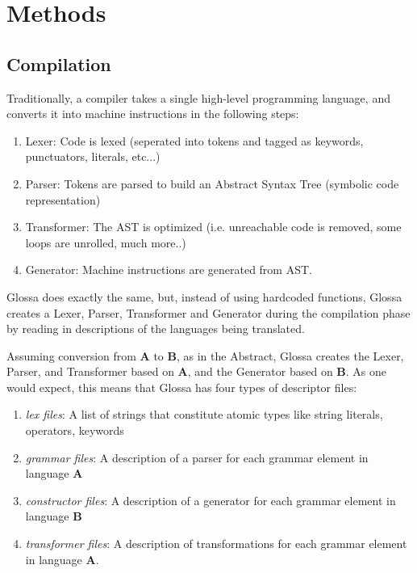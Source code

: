 \documentclass{article}
\begin{document}
\section{Methods}

\subsection{Compilation}
Traditionally, a compiler takes a single high-level programming language, and converts it into machine instructions in the following steps:
\begin{enumerate}
\item Lexer: Code is lexed (seperated into tokens and tagged as keywords, punctuators, literals, etc...)
\item Parser: Tokens are parsed to build an Abstract Syntax Tree (symbolic code representation)
\item Transformer: The AST is optimized (i.e. unreachable code is removed, some loops are unrolled, much more..)
\item Generator: Machine instructions are generated from AST.
\end{enumerate}

Glossa does exactly the same, but, instead of using hardcoded functions, Glossa creates a Lexer, Parser, Transformer and Generator during the compilation phase by reading in descriptions of the languages being translated.

Assuming conversion from \textbf{A} to \textbf{B}, as in the Abstract, Glossa creates the Lexer, Parser, and Transformer based on \textbf{A}, and the Generator based on \textbf{B}.
As one would expect, this means that Glossa has four types of descriptor files:

\begin{enumerate}
    \item \textit{lex files}: A list of strings that constitute atomic types like string literals, operators, keywords 
    \item \textit{grammar files}: A description of a parser for each grammar element in language \textbf{A} 
    \item \textit{constructor files}: A description of a generator for each grammar element in language \textbf{B}
    \item \textit{transformer files}: A description of transformations for each grammar element in language \textbf{A}.
\end{enumerate}
\end{document}
